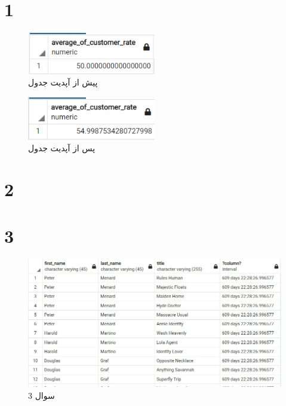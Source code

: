 \documentclass{article}
\begin{document}


\newpage


\section{1}
\begin{figure}[H]
    \centering
    \includegraphics[width=0.5\textwidth]{figures/1.c.1.png}
    \caption
	{
پیش از آپدیت جدول 
	}
    \label{fig:fig1}
\end{figure}
\begin{figure}[H]
    \centering
    \includegraphics[width=0.5\textwidth]{figures/1.c.2.png}
    \caption
	{
پس از آپدیت جدول 
	}
    \label{fig:fig1}
\end{figure}


\section{2}


\section{3}
\begin{figure}[H]
    \centering
    \includegraphics[width=1\textwidth]{figures/3.jpg}
    \caption
	{
سوال 3
	}
    \label{fig:fig1}
\end{figure}
\end{document}

